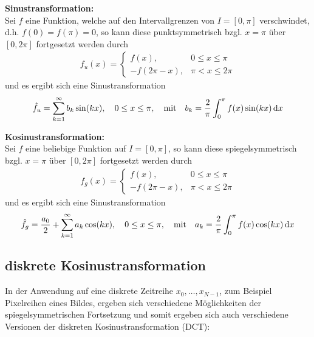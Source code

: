 \textbf{Sinustransformation:} \\
Sei $f$ eine Funktion, welche auf den Intervallgrenzen von $I=[0,\pi]$ verschwindet, d.h. $f(0)=f(\pi)=0$, so kann 
diese punktsymmetrisch bzgl. $x=\pi$ über $[0,2\pi]$ fortgesetzt werden durch 
%
\begin{align*}
  f_u(x) = \begin{cases}
    f(x), & 0\leq x \leq \pi \\
    -f(2\pi-x), &\pi < x \leq 2\pi
  \end{cases}
\end{align*}
%
und es ergibt sich eine Sinustransformation 
%
\begin{align*}
  \hat{f}_u = \sum_{k=1}^{\infty} b_k\sin(kx), 
  \quad 0\leq x\leq \pi, 
  \quad\text{mit}\quad b_k = \dfrac{2}{\pi}\int_{0}^{\pi} f(x) \sin(kx) \mathop{}\!\mathrm{d} x
\end{align*}
%

\textbf{Kosinustransformation:} \\
Sei $f$ eine beliebige Funktion auf $I=[0,\pi]$, so kann 
diese spiegelsymmetrisch bzgl. $x=\pi$ über $[0,2\pi]$ fortgesetzt werden durch 
%
\begin{align*}
  f_g(x) = \begin{cases}
    f(x), & 0\leq x \leq \pi \\
    -f(2\pi-x), &\pi < x \leq 2\pi
  \end{cases}
\end{align*}
%
und es ergibt sich eine Sinustransformation 
%
\begin{align*}
  \hat{f}_g = \dfrac{a_0}{2} + \sum_{k=1}^{\infty} a_k\cos(kx), 
  \quad 0\leq x\leq \pi, 
  \quad\text{mit}\quad a_k = \dfrac{2}{\pi}\int_{0}^{\pi} f(x) \cos(kx) \mathop{}\!\mathrm{d} x
\end{align*}
%

\subsection{diskrete Kosinustransformation}

In der Anwendung auf eine diskrete Zeitreihe $x_0,\dots,x_{N-1}$, zum Beispiel Pixelreihen eines Bildes, ergeben 
sich verschiedene Möglichkeiten der spiegelsymmetrischen Fortsetzung und somit ergeben sich auch verschiedene 
Versionen der diskreten Kosinustransformation (DCT):

